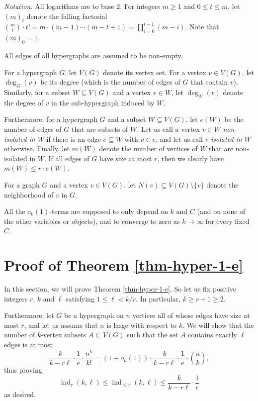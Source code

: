 \documentclass[11pt]{article}
\theoremstyle{definition}
\numberwithin{equation}{section}
\begin{document}
\noindent\textit{Notation.} All logarithms are to base 2. For integers $m\geq 1$ and $0\leq t\leq m$, let $(m)_t$ denote the falling factorial ${m\choose t}\cdot t!=m\cdot (m-1)\dotsm (m-t+1)=\prod_{i=0}^{t-1}(m-i)$. Note that $(m)_0=1$.

All edges of all hypergraphs are assumed to be non-empty.

For a hypergraph $G$, let $V(G)$ denote its vertex set. For a vertex $v\in V(G)$, let $\deg_G(v)$ be its degree (which is the number of edges of $G$ that contain $v$). Similarly, for a subset $W\subseteq V(G)$ and a vertex $v\in W$, let $\deg_W(v)$ denote the degree of $v$ in the sub-hypergraph induced by $W$.

Furthermore, for a hypergraph $G$ and a subset $W\subseteq V(G)$, let $e(W)$ be the number of edges of $G$ that are subsets of $W$. Let us call a vertex $v\in W$ \emph{non-isolated in $W$} if there is an edge $e\subseteq W$ with $v\in e$, and let us call $v$ \emph{isolated in $W$} otherwise. Finally, let $m(W)$ denote the number of vertices of $W$ that are non-isolated in $W$. If all edges of $G$ have size at most $r$, then we clearly have $m(W)\leq r\cdot e(W)$.

For a graph $G$ and a vertex $v\in V(G)$, let $N(v)\subseteq V(G)\setminus \lbrace v\rbrace$ denote the neighborhood of $v$ in $G$.

All the $o_k(1)$-terms are supposed to only depend on $k$ and $C$ (and on none of the other variables or objects), and to converge to zero as $k\to \infty$ for every fixed $C$.

\section{Proof of Theorem \ref{thm-hyper-1-e}}\label{sect-hyper-1-e}

In this section, we will prove Theorem \ref{thm-hyper-1-e}. So let us fix positive integers $r$, $k$ and $\ell$ satisfying $1\leq \ell<k/r$. In particular, $k\geq r+1\geq 2$.

Furthermore, let $G$ be a hypergraph on $n$ vertices all of whose edges have size at most $r$, and let us assume that $n$ is large with respect to $k$. We will show that the number of $k$-vertex subsets $A\subseteq V(G)$ such that the set $A$ contains exactly $\ell$ edges is at most
\[\frac{k}{k-r\ell}\cdot \frac{1}{e}\cdot \frac{n^k}{k!}=(1+o_n(1))\cdot\frac{k}{k-r\ell}\cdot \frac{1}{e}\cdot {n\choose k},\]
thus proving
\[\operatorname{ind}_{r}(k,\ell)\leq \operatorname{ind}_{\leq r}(k,\ell)\leq \frac{k}{k-r\ell}\cdot \frac{1}{e}\]
as desired.
\end{document}
